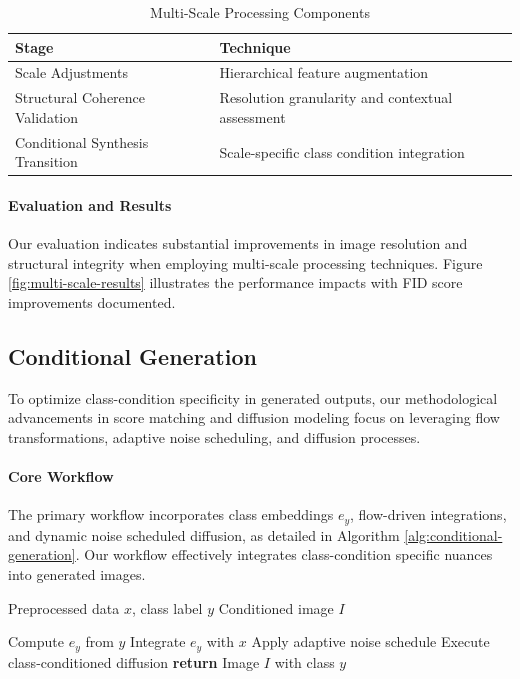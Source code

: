 \documentclass{article} %
\begin{document}
\begin{table}[!ht]
\centering
\label{tab:multi-scale-components}
\begin{tabular}{|l|l|}
\hline
\textbf{Stage} & \textbf{Technique} \\ \hline
Scale Adjustments & Hierarchical feature augmentation \\ \hline
Structural Coherence Validation & Resolution granularity and contextual assessment \\ \hline
Conditional Synthesis Transition & Scale-specific class condition integration \\ \hline
\end{tabular}
\caption{Multi-Scale Processing Components}
\end{table}

\paragraph{Evaluation and Results}

Our evaluation indicates substantial improvements in image resolution and structural integrity when employing multi-scale processing techniques. Figure \ref{fig:multi-scale-results} illustrates the performance impacts with FID score improvements documented.

\subsection{Conditional Generation}

To optimize class-condition specificity in generated outputs, our methodological advancements in score matching and diffusion modeling focus on leveraging flow transformations, adaptive noise scheduling, and diffusion processes.

\paragraph{Core Workflow}

The primary workflow incorporates class embeddings \(e_y\), flow-driven integrations, and dynamic noise scheduled diffusion, as detailed in Algorithm \ref{alg:conditional-generation}. Our workflow effectively integrates class-condition specific nuances into generated images.

\begin{algorithm}
\caption{Algorithm for Conditional Generation}
\label{alg:conditional-generation}
\begin{algorithmic}[1]
\REQUIRE Preprocessed data $x$, class label $y$
\ENSURE Conditioned image $I$

\STATE Compute $e_y$ from $y$
\STATE Integrate $e_y$ with $x$
\STATE Apply adaptive noise schedule
\STATE Execute class-conditioned diffusion
\STATE \textbf{return} Image $I$ with class $y$

\end{algorithmic}
\end{algorithm}
\end{document}
